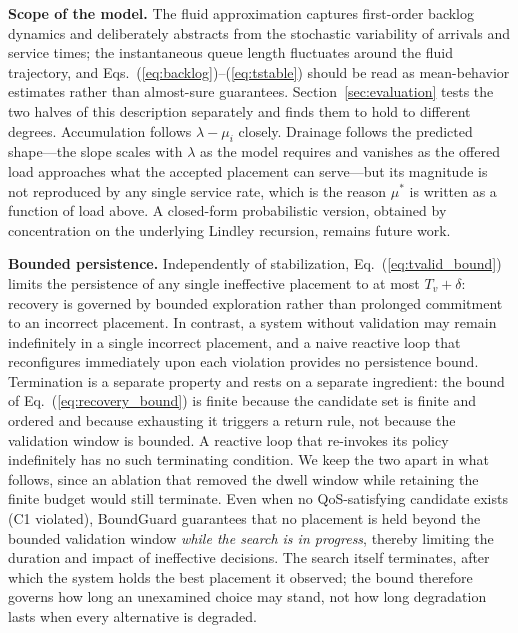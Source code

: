 \documentclass[conference]{IEEEtran}
\begin{document}
\noindent\textbf{Scope of the model.}
The fluid approximation captures first-order backlog dynamics and deliberately abstracts from the stochastic variability of arrivals and service times; the instantaneous queue length fluctuates around the fluid trajectory, and Eqs.~(\ref{eq:backlog})--(\ref{eq:tstable}) should be read as mean-behavior estimates rather than almost-sure guarantees. \textcolor{navyblue}{Section~\ref{sec:evaluation} tests the two halves of this description separately and finds them to hold to different degrees. Accumulation follows $\lambda-\mu_i$ closely. Drainage follows the predicted shape---the slope scales with $\lambda$ as the model requires and vanishes as the offered load approaches what the accepted placement can serve---but its magnitude is not reproduced by any single service rate, which is the reason $\mu^{\ast}$ is written as a function of load above. A closed-form probabilistic version, obtained by concentration on the underlying Lindley recursion, remains future work.}

\noindent\textbf{Bounded persistence.}
Independently of stabilization, Eq.~(\ref{eq:tvalid_bound}) limits the persistence of any single ineffective placement to at most $T_v + \delta$: recovery is governed by bounded exploration rather than prolonged commitment to an incorrect placement. In contrast, a system without validation may remain indefinitely in a single incorrect placement, and a naive reactive loop that reconfigures immediately upon each violation provides no persistence bound. \textcolor{navyblue}{Termination is a separate property and rests on a separate ingredient: the bound of Eq.~(\ref{eq:recovery_bound}) is finite because the candidate set is finite and ordered and because exhausting it triggers a return rule, not because the validation window is bounded. A reactive loop that re-invokes its policy indefinitely has no such terminating condition. We keep the two apart in what follows, since an ablation that removed the dwell window while retaining the finite budget would still terminate.} Even when no QoS-satisfying candidate exists (C1 violated), BoundGuard guarantees that no placement is held beyond the bounded validation window \emph{while the search is in progress}, thereby limiting the duration and impact of ineffective decisions. \textcolor{navyblue}{The search itself terminates, after which the system holds the best placement it observed; the bound therefore governs how long an unexamined choice may stand, not how long degradation lasts when every alternative is degraded.}
\end{document}
